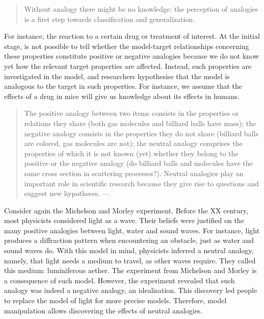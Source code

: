 \documentclass[
  12pt,
]{book}
\begin{document}
\begin{quote}
Without analogy there might be no knowledge: the perception of analogies is a first step towards classification and generalization. \citep{bunge2012method}
\end{quote}

For instance, the reaction to a certain drug or treatment of interest. At the initial stage, is not possible to tell whether the model-target relationships concerning these properties constitute positive or negative analogies because we do not know yet how the relevant target properties are affected. Instead, such properties are investigated in the model, and researchers hypothesise that the model is analogous to the target in such properties. For instance, we assume that the effects of a drug in mice will give us knowledge about its effects in humans.

\begin{quote}
The positive analogy between two items consists in the properties or relations they share (both gas molecules and billiard balls have mass); the negative analogy consists in the properties they do not share (billiard balls are colored, gas molecules are not); the neutral analogy comprises the properties of which it is not known (yet) whether they belong to the positive or the negative analogy (do billiard balls and molecules have the same cross section in scattering processes?). Neutral analogies play an important role in scientific research because they give rise to questions and suggest new hypotheses. --- \citep{sep-models-science}
\end{quote}

Consider again the Michelson and Morley experiment. Before the XX century, most physicists considered light as a wave. Their beliefs were justified on the many positive analogies between light, water and sound waves. For instance, light produces a diffraction pattern when encountering an obstacle, just as water and sound waves do. With this model in mind, physicists inferred a neutral analogy, namely, that light needs a medium to travel, as other waves require. They called this medium: luminiferous aether. The experiment from Michelson and Morley is a consequence of such model. However, the experiment revealed that such analogy was indeed a negative analogy, an idealisation. This discovery led people to replace the model of light for more precise models. Therefore, model manipulation allows discovering the effects of neutral analogies.
\end{document}
